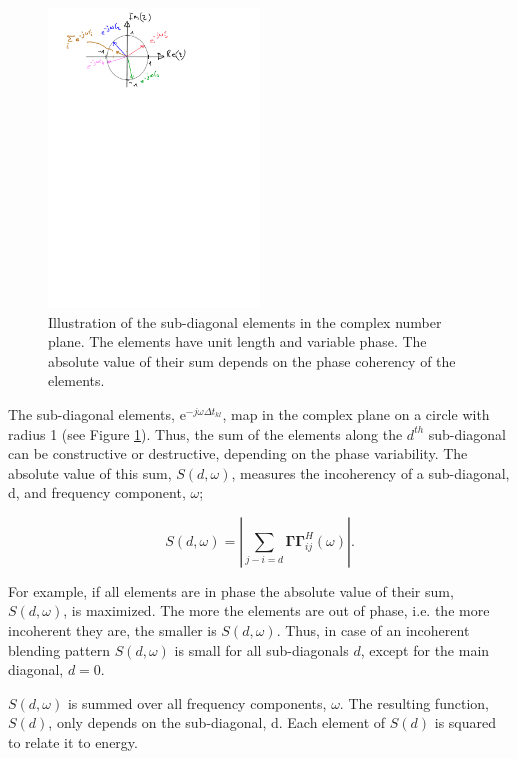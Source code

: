 \begin{figure}
	\centering
	\includegraphics[width = 0.5\textwidth]{Plots/complex-circle}
	\caption{Illustration of the sub-diagonal elements in the complex number plane. The elements have unit length and variable phase. The absolute value of their sum depends on the phase coherency of the elements.}
	\label{fig:Ch-Results-complex-circle}
\end{figure}

The sub-diagonal elements, $\mathrm{e}^{-j \omega \Delta t_{kl}}$, map in the complex plane on a circle with radius 1 (see Figure \ref{fig:Ch-Results-complex-circle}). Thus, the sum of the elements along the $d^{th}$ sub-diagonal can be constructive or destructive, depending on the phase variability. The absolute value of this sum, $S(d,\omega)$, measures the incoherency of a sub-diagonal, d, and frequency component, $\omega$;

\begin{equation}
	S(d,\omega) = \left| \sum_{j-i=d} \mathbf{\Gamma \Gamma}^H_{ij} (\omega) \right|.
	\label{eq:Ch-Results-incoherency-diagsum}	
\end{equation} 

For example, if all elements are in phase the absolute value of their sum, $S(d,\omega)$, is maximized. The more the elements are out of phase, i.e. the more incoherent they are, the smaller is $S(d,\omega)$. Thus, in case of an incoherent blending pattern $S(d,\omega)$ is small for all sub-diagonals $d$, except for the main diagonal, $d = 0$.  

$S(d,\omega)$ is summed over all frequency components, $\omega$. The resulting function, $S(d)$, only depends on the sub-diagonal, d. Each element of $S(d)$ is squared to relate it to energy. 

